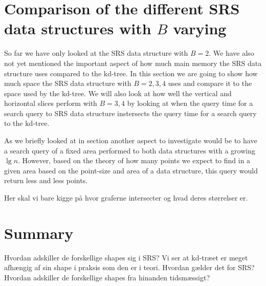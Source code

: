 \section{Comparison of the different SRS data structures with $B$ varying}

So far we have only looked at the SRS data structure with $B=2$. We have also not yet mentioned the important aspect of how much main memory the SRS data structure uses compared to the kd-tree. In this section we are going to show how much space the SRS data structure with $B={2,3,4}$ uses and compare it to the space used by the kd-tree. We will also look at how well the vertical and horizontal slices perform with $B={3,4}$ by looking at when the query time for a search query to SRS data structure instersects the query time for a search query to the kd-tree. 


As we briefly looked at in section another aspect to investigate would be to have a search query of a fixed area performed to both data structures with a growing $\lg n$. However, based on the theory of how many points we expect to find in a given area based on the point-size and area of a data structure, this query would return less and less points. 

Her skal vi bare kigge på hvor graferne intersecter og hvad deres størrelser er.

\section{Summary}

Hvordan adskiller de forskellige shapes sig i SRS? Vi ser at kd-træet er meget afhængig af sin shape i praksis som den er i teori. Hvordan gælder det for SRS? Hvordan adskiller de forskellige shapes fra hinanden tidsmæssigt? 
